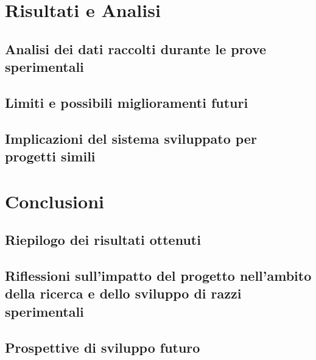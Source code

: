 \documentclass[12pt,a4paper,twoside]{book}
\begin{document}
\chapter{Risultati e Analisi} \label{chap:results}

\section{Analisi dei dati raccolti durante le prove sperimentali}
\section{Limiti e possibili miglioramenti futuri}
\section{Implicazioni del sistema sviluppato per progetti simili}

\chapter{Conclusioni} \label{chap:conclusion}

\section{Riepilogo dei risultati ottenuti}
\section{Riflessioni sull'impatto del progetto nell'ambito della ricerca e dello sviluppo di razzi sperimentali}
\section{Prospettive di sviluppo futuro}
\end{document}
